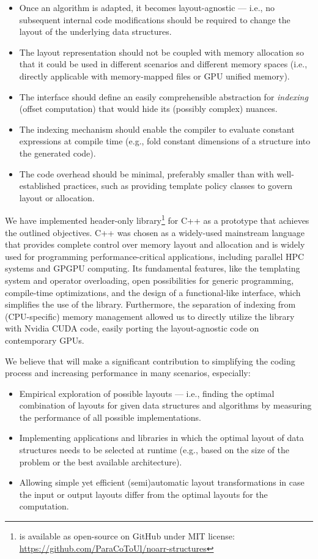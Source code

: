 \begin{itemize}
    \item Once an algorithm is adapted, it becomes layout-agnostic --- i.e., no subsequent internal code modifications should be required to change the layout of the underlying data structures.
    \item The layout representation should not be coupled with memory allocation so that it could be used in different scenarios and different memory spaces (i.e., directly applicable with memory-mapped files or GPU unified memory).
    \item The interface should define an easily comprehensible abstraction for \emph{indexing} (offset computation) that would hide its (possibly complex) nuances.
    \item The indexing mechanism should enable the compiler to evaluate constant expressions at compile time (e.g., fold constant dimensions of a structure into the generated code).
    \item The code overhead should be minimal, preferably smaller than with well-established practices, such as providing template policy classes to govern layout or allocation.
\end{itemize}

We have implemented \Noarr{} header-only library\footnote{\Noarr{} is available as open-source on GitHub under MIT license: \url{https://github.com/ParaCoToUl/noarr-structures}} for C++ as a prototype that achieves the outlined objectives. C++ was chosen as a widely-used mainstream language that provides complete control over memory layout and allocation and is widely used for programming performance-critical applications, including parallel HPC systems and GPGPU computing. Its fundamental features, like the templating system and operator overloading, open possibilities for generic programming, compile-time optimizations, and the design of a functional-like interface, which simplifies the use of the library. Furthermore, the separation of indexing from (CPU-specific) memory management allowed us to directly utilize the library with Nvidia CUDA code, easily porting the layout-agnostic code on contemporary GPUs.

We believe that \Noarr{} will make a significant contribution to simplifying the coding process and increasing performance in many scenarios, especially:
\begin{itemize}
    \item Empirical exploration of possible layouts --- i.e., finding the optimal combination of layouts for given data structures and algorithms by measuring the performance of all possible implementations.
    \item Implementing applications and libraries in which the optimal layout of data structures needs to be selected at runtime (e.g., based on the size of the problem or the best available architecture).
    \item Allowing simple yet efficient (semi)automatic layout transformations in case the input or output layouts differ from the optimal layouts for the computation.
\end{itemize}

